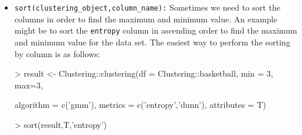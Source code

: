 \begin{itemize}
  \item \texttt{sort(clustering\_object,column\_name):} Sometimes we need to sort the columns in order to find the maximum and minimum value. An example might be to sort the \texttt{entropy} column in ascending order to find the maximum and minimum value for the data set. The easiest way to perform the sorting by column is as follows:
  \begin{Schunk}
\begin{Sinput}
> result <- Clustering::clustering(df = Clustering::basketball, min = 3, max=3,
\end{Sinput}
\begin{Sinput}
           algorithm = c('gmm'), metrics = c('entropy','dunn'), attributes = T)
 \end{Sinput}
\end{Schunk}
\begin{Schunk}
\begin{Sinput}
>  sort(result,T,'entropy')
\end{Sinput}
\end{Schunk}


\end{itemize}
